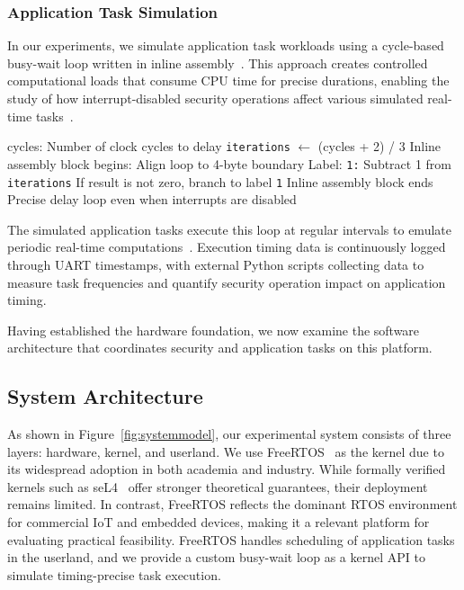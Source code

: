 \documentclass[a4paper,10pt]{article}
\begin{document}
{\subsubsection{Application Task Simulation}


In our experiments, we simulate application task workloads using a cycle-based busy-wait loop written in inline assembly~\cite{francillon2014minimalist}.
This approach creates controlled computational loads that consume CPU time for precise durations, enabling the study of how interrupt-disabled security operations affect various simulated real-time tasks~\cite{brasser2016remote}.


\begin{algorithm}
\caption{\_busy\_cycles delay loop (used when interrupts are disabled)}
\begin{algorithmic}[1]
\Require cycles: Number of clock cycles to delay
\State \texttt{iterations} $\gets$ (cycles + 2) / 3
\State Inline assembly block begins:
\State \quad Align loop to 4-byte boundary
\State \quad Label: \texttt{1:}
\State \quad Subtract 1 from \texttt{iterations}
\State \quad If result is not zero, branch to label \texttt{1}
\State \quad Inline assembly block ends
\Ensure Precise delay loop even when interrupts are disabled
\end{algorithmic}
\end{algorithm}


The simulated application tasks execute this loop at regular intervals to emulate periodic real-time computations~\cite{freertos2025}. 
Execution timing data is continuously logged through UART timestamps, with external Python scripts collecting data to measure task frequencies and quantify security operation impact on application timing.


Having established the hardware foundation, we now examine the software architecture that coordinates security and application tasks on this platform.


\subsection{System Architecture}

As shown in Figure~\ref{fig:systemmodel}, our experimental system consists of three layers: hardware, kernel, and userland. We use FreeRTOS~\cite{freertos2025} as the kernel due to its widespread adoption in both academia and industry.
While formally verified kernels such as seL4~\cite{klein2009sel4} offer stronger theoretical guarantees, their deployment remains limited. 
In contrast, FreeRTOS reflects the dominant RTOS environment for commercial IoT and embedded devices, making it a relevant platform for evaluating practical feasibility. FreeRTOS handles scheduling of application tasks in the userland, and we provide a custom busy-wait loop as a kernel API to simulate timing-precise task execution.

}
\end{document}

